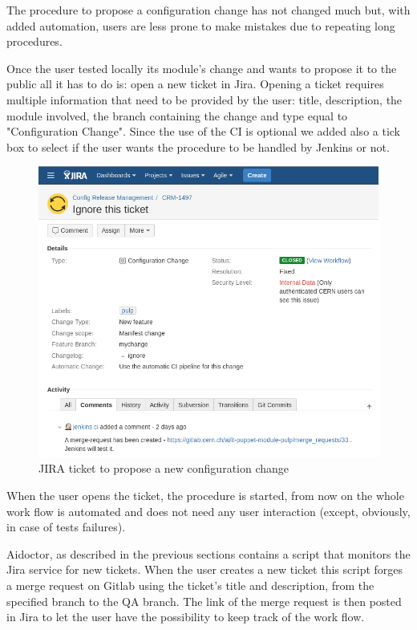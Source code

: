 The procedure to propose a configuration change has not changed much but,
with added automation, users are less prone to make mistakes due to
repeating long procedures.

Once the user tested locally its module's change and wants to propose it
to the public all it has to do is: open a new ticket in Jira. Opening
a ticket requires multiple information that need to be provided by the
user: title, description, the module involved, the branch containing the
change and type equal to "Configuration Change". Since the use of the CI
is optional we added also a tick box to select if the user wants the
procedure to be handled by Jenkins or not.

\begin{figure}[H]
\includegraphics[width=\textwidth,height=\textheight,keepaspectratio]{ContinuousIntegrationWithJenkins/images/add_crm_change.jpg}
\caption{JIRA ticket to propose a new configuration change}
\end{figure}

When the user opens the ticket, the procedure is started, from now on the
whole work flow is automated and does not need any user interaction
(except, obviously, in case of tests failures).

Aidoctor, as described in the previous sections contains a script that
monitors the Jira service for new tickets. When the user creates a new
ticket this script forges a merge request on Gitlab using the ticket's
title and description, from the specified branch to the QA branch. The
link of the merge request is then posted in Jira to let the user have the
possibility to keep track of the work flow.

